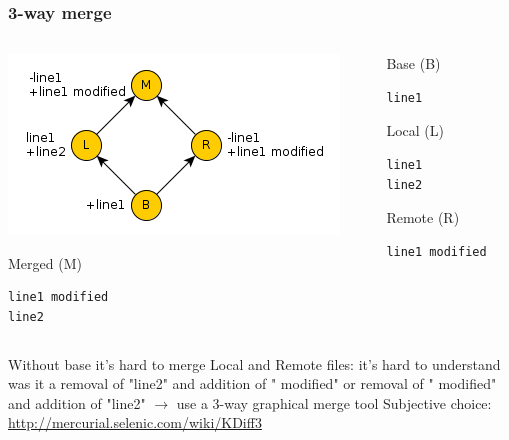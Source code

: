 \documentclass{beamer}
\begin{document}
\begin{frame}[fragile]
\frametitle{3-way merge}
\begin{columns}[T]
\begin{column}{0.45\textwidth}
\includegraphics[width=\textwidth]{img/3way_merge}

\begin{exampleblock}{Merged (M)}
\begin{verbatim}
line1 modified
line2
\end{verbatim}
\end{exampleblock}

\end{column}
\begin{column}{0.45\textwidth}
\begin{exampleblock}{Base (B)}
\begin{verbatim}
line1
\end{verbatim}
\end{exampleblock}

\begin{exampleblock}{Local (L)}
\begin{verbatim}
line1
line2
\end{verbatim}
\end{exampleblock}

\begin{exampleblock}{Remote (R)}
\begin{verbatim}
line1 modified
\end{verbatim}
\end{exampleblock}

\end{column}
\end{columns}

\begin{center}
Without base it's hard to merge Local and Remote files: it's hard to understand was it a removal of "line2" and addition of " modified" or removal of " modified" and addition of "line2" $\to$ use a 3-way graphical merge tool
Subjective choice: \url{http://mercurial.selenic.com/wiki/KDiff3}
\end{center}
\end{frame}
\end{document}

